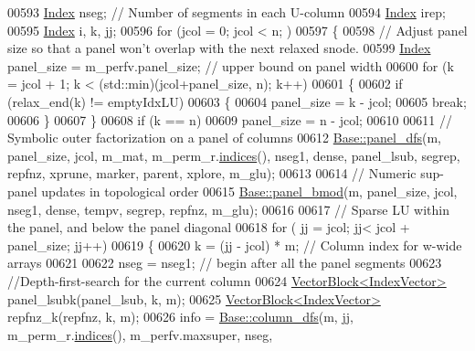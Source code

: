 \begin{DoxyCode}
00593   \hyperlink{namespace_eigen_a62e77e0933482dafde8fe197d9a2cfde}{Index} nseg; \textcolor{comment}{// Number of segments in each U-column }
00594   \hyperlink{namespace_eigen_a62e77e0933482dafde8fe197d9a2cfde}{Index} irep; 
00595   \hyperlink{namespace_eigen_a62e77e0933482dafde8fe197d9a2cfde}{Index} i, k, jj; 
00596   \textcolor{keywordflow}{for} (jcol = 0; jcol < n; )
00597   \{
00598     \textcolor{comment}{// Adjust panel size so that a panel won't overlap with the next relaxed snode. }
00599     \hyperlink{namespace_eigen_a62e77e0933482dafde8fe197d9a2cfde}{Index} panel\_size = m\_perfv.panel\_size; \textcolor{comment}{// upper bound on panel width}
00600     \textcolor{keywordflow}{for} (k = jcol + 1; k < (std::min)(jcol+panel\_size, n); k++)
00601     \{
00602       \textcolor{keywordflow}{if} (relax\_end(k) != emptyIdxLU) 
00603       \{
00604         panel\_size = k - jcol; 
00605         \textcolor{keywordflow}{break}; 
00606       \}
00607     \}
00608     \textcolor{keywordflow}{if} (k == n) 
00609       panel\_size = n - jcol; 
00610       
00611     \textcolor{comment}{// Symbolic outer factorization on a panel of columns }
00612     \hyperlink{group___sparse_l_u___module_acaf62fda387ea03e9caa2734e4e7b0c9}{Base::panel\_dfs}(m, panel\_size, jcol, m\_mat, m\_perm\_r.\hyperlink{group___core___module_a2f1ab379207fcd1ceb33941e25cf50c2}{indices}(), nseg1, dense, 
      panel\_lsub, segrep, repfnz, xprune, marker, parent, xplore, m\_glu); 
00613     
00614     \textcolor{comment}{// Numeric sup-panel updates in topological order }
00615     \hyperlink{group___sparse_l_u___module_a277936738db49e25285164ac25c498c3}{Base::panel\_bmod}(m, panel\_size, jcol, nseg1, dense, tempv, segrep, repfnz, m\_glu); 
00616     
00617     \textcolor{comment}{// Sparse LU within the panel, and below the panel diagonal }
00618     \textcolor{keywordflow}{for} ( jj = jcol; jj< jcol + panel\_size; jj++) 
00619     \{
00620       k = (jj - jcol) * m; \textcolor{comment}{// Column index for w-wide arrays }
00621       
00622       nseg = nseg1; \textcolor{comment}{// begin after all the panel segments}
00623       \textcolor{comment}{//Depth-first-search for the current column}
00624       \hyperlink{group___core___module_class_eigen_1_1_vector_block}{VectorBlock<IndexVector>} panel\_lsubk(panel\_lsub, k, m);
00625       \hyperlink{group___core___module_class_eigen_1_1_vector_block}{VectorBlock<IndexVector>} repfnz\_k(repfnz, k, m); 
00626       info = \hyperlink{group___sparse_l_u___module_a6f543ae02eb6467e9bcc1e5cec8ccdd2}{Base::column\_dfs}(m, jj, m\_perm\_r.\hyperlink{group___core___module_a2f1ab379207fcd1ceb33941e25cf50c2}{indices}(), m\_perfv.maxsuper, nseg, 

\end{DoxyCode}
